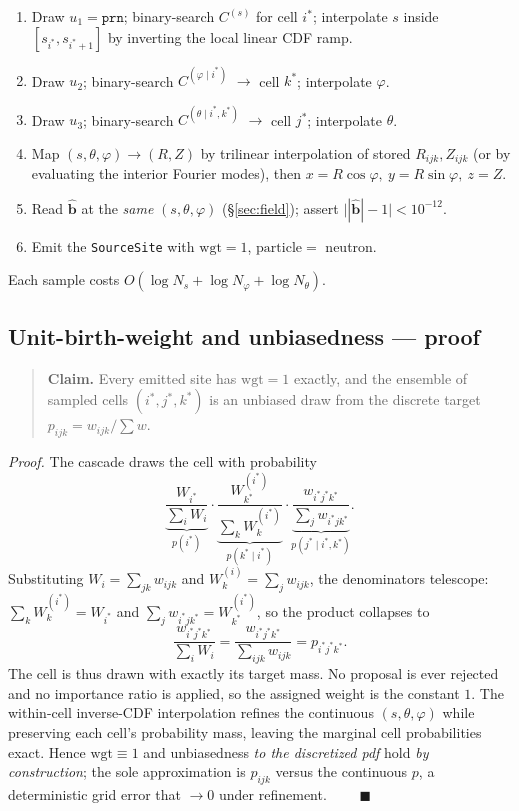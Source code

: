 \documentclass[11pt]{article}
\newcommand{\bhat}{\hat{\mathbf{b}}}
\newcommand{\code}[1]{\texttt{#1}}
\begin{document}
\begin{enumerate}
\item Draw $u_1=\code{prn}$; binary-search $C^{(s)}$ for cell $i^\ast$; interpolate
$s$ inside $[s_{i^\ast},s_{i^\ast+1}]$ by inverting the local linear CDF ramp.
\item Draw $u_2$; binary-search $C^{(\varphi\mid i^\ast)}$ $\to$ cell $k^\ast$;
interpolate $\varphi$.
\item Draw $u_3$; binary-search $C^{(\theta\mid i^\ast,k^\ast)}$ $\to$ cell $j^\ast$;
interpolate $\theta$.
\item Map $(s,\theta,\varphi)\to(R,Z)$ by trilinear interpolation of stored
$R_{ijk},Z_{ijk}$ (or by evaluating the interior Fourier modes), then
$x=R\cos\varphi,\ y=R\sin\varphi,\ z=Z$.
\item Read $\bhat$ at the \emph{same} $(s,\theta,\varphi)$ (\S\ref{sec:field});
assert $\big||\bhat|-1\big|<10^{-12}$.
\item Emit the \code{SourceSite} with $\mathrm{wgt}=1$, $\mathrm{particle}=$ neutron.
\end{enumerate}
Each sample costs $O(\log N_s+\log N_\varphi+\log N_\theta)$.

\subsection{Unit-birth-weight and unbiasedness --- proof}
\label{sec:unitweight}

\begin{quote}
\textbf{Claim.} Every emitted site has $\mathrm{wgt}=1$ exactly, and the ensemble of
sampled cells $(i^\ast,j^\ast,k^\ast)$ is an unbiased draw from the discrete target
$p_{ijk}=w_{ijk}/\sum w$.
\end{quote}
\emph{Proof.} The cascade draws the cell with probability
\begin{equation}
\underbrace{\frac{W_{i^\ast}}{\sum_i W_i}}_{p(i^\ast)}\cdot
\underbrace{\frac{W^{(i^\ast)}_{k^\ast}}{\sum_k W^{(i^\ast)}_k}}_{p(k^\ast\mid
i^\ast)}\cdot
\underbrace{\frac{w_{i^\ast j^\ast k^\ast}}{\sum_j w_{i^\ast j k^\ast}}}_{p(j^\ast\mid
i^\ast,k^\ast)} .
\end{equation}
Substituting $W_{i}=\sum_{jk}w_{ijk}$ and $W^{(i)}_k=\sum_j w_{ijk}$, the
denominators telescope: $\sum_k W^{(i^\ast)}_k=W_{i^\ast}$ and $\sum_j w_{i^\ast j
k^\ast}=W^{(i^\ast)}_{k^\ast}$, so the product collapses to
\begin{equation}
\frac{w_{i^\ast j^\ast k^\ast}}{\sum_i W_i}=\frac{w_{i^\ast j^\ast
k^\ast}}{\sum_{ijk} w_{ijk}}=p_{i^\ast j^\ast k^\ast}.
\end{equation}
The cell is thus drawn with exactly its target mass. No proposal is ever rejected and
no importance ratio is applied, so the assigned weight is the constant $1$. The
within-cell inverse-CDF interpolation refines the continuous $(s,\theta,\varphi)$ while
preserving each cell's probability mass, leaving the marginal cell probabilities
exact. Hence $\mathrm{wgt}\equiv1$ and unbiasedness \emph{to the discretized pdf} hold
\emph{by construction}; the sole approximation is $p_{ijk}$ versus the continuous $p$,
a deterministic grid error that $\to0$ under refinement. $\qquad\blacksquare$
\end{document}
